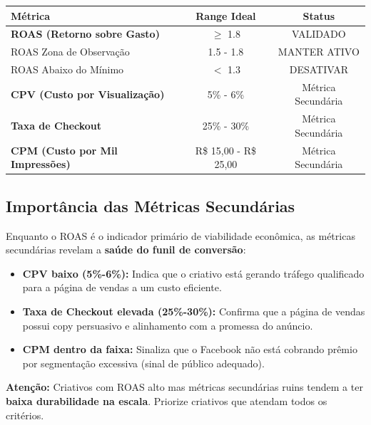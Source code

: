 \documentclass[12pt, a4paper]{article}
\newcommand{\reais}[1]{R\$ #1}
\begin{document}
\begin{table}[H]
    \centering
    \renewcommand{\arraystretch}{1.5}
    \begin{tabularx}{\textwidth}{X c c}
        \toprule
        \rowcolor{tableHeader} \textbf{Métrica} & \textbf{Range Ideal} & \textbf{Status} \\
        \midrule
        \textbf{ROAS (Retorno sobre Gasto)} & $\geq$ 1.8 & \textcolor{successGreen}{VALIDADO} \\
        \rowcolor{lightGray}
        ROAS Zona de Observação & 1.5 - 1.8 & \textcolor{warningOrange}{MANTER ATIVO} \\
        ROAS Abaixo do Mínimo & $<$ 1.3 & \textcolor{accentColor}{DESATIVAR} \\
        \midrule
        \textbf{CPV (Custo por Visualização)} & 5\% - 6\% & Métrica Secundária \\
        \rowcolor{lightGray}
        \textbf{Taxa de Checkout} & 25\% - 30\% & Métrica Secundária \\
        \textbf{CPM (Custo por Mil Impressões)} & \reais{15,00} - \reais{25,00} & Métrica Secundária \\
        \bottomrule
    \end{tabularx}
\end{table}

\subsection{Importância das Métricas Secundárias}

Enquanto o ROAS é o indicador primário de viabilidade econômica, as métricas secundárias revelam a \textbf{saúde do funil de conversão}:

\begin{itemize}
    \item \textbf{CPV baixo (5\%-6\%):} Indica que o criativo está gerando tráfego qualificado para a página de vendas a um custo eficiente.
    \item \textbf{Taxa de Checkout elevada (25\%-30\%):} Confirma que a página de vendas possui copy persuasivo e alinhamento com a promessa do anúncio.
    \item \textbf{CPM dentro da faixa:} Sinaliza que o Facebook não está cobrando prêmio por segmentação excessiva (sinal de público adequado).
\end{itemize}

\textcolor{accentColor}{\textbf{Atenção:}} Criativos com ROAS alto mas métricas secundárias ruins tendem a ter \textbf{baixa durabilidade na escala}. Priorize criativos que atendam todos os critérios.
\end{document}
